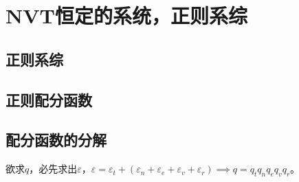 \chapter{NVT恒定的系统，正则系综}

\section{正则系综}

\section{正则配分函数}


\section{配分函数的分解}


欲求$q$，必先求出$\varepsilon$，$\varepsilon = \varepsilon_t + (\varepsilon_n + \varepsilon_e + \varepsilon_v + \varepsilon_r) \implies q = q_t q_n q_e q_v q_r $。
















